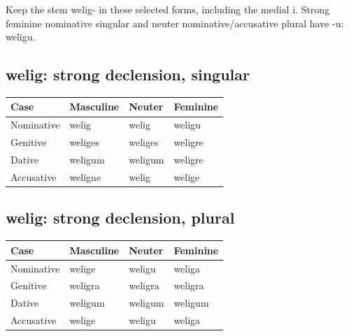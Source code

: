 Keep the stem welig- in these selected forms, including the medial i. Strong feminine nominative singular and neuter nominative/\allowbreak{}accusative plural have -u: weligu.

\subsection*{welig: strong declension, singular}

\par\begingroup
\fontsize{10.5}{13.2}\selectfont
\setlength{\LTleft}{0pt}\setlength{\LTright}{\fill}
\noindent
\begin{tabular}{@{}>{\raggedright\arraybackslash}p{28.89mm}>{\raggedright\arraybackslash}p{28.89mm}>{\raggedright\arraybackslash}p{28.89mm}>{\raggedright\arraybackslash}p{28.89mm}@{}}
\toprule
\textbf{Case} & \textbf{Masculine} & \textbf{Neuter} & \textbf{Feminine} \\
\midrule
Nominative & welig & welig & weligu \\
Genitive & weliges & weliges & weligre \\
Dative & weligum & weligum & weligre \\
Accusative & weligne & welig & welige \\
\bottomrule
\end{tabular}
\par\endgroup

\subsection*{welig: strong declension, plural}

\par\begingroup
\fontsize{10.5}{13.2}\selectfont
\setlength{\LTleft}{0pt}\setlength{\LTright}{\fill}
\noindent
\begin{tabular}{@{}>{\raggedright\arraybackslash}p{28.89mm}>{\raggedright\arraybackslash}p{28.89mm}>{\raggedright\arraybackslash}p{28.89mm}>{\raggedright\arraybackslash}p{28.89mm}@{}}
\toprule
\textbf{Case} & \textbf{Masculine} & \textbf{Neuter} & \textbf{Feminine} \\
\midrule
Nominative & welige & weligu & weliga \\
Genitive & weligra & weligra & weligra \\
Dative & weligum & weligum & weligum \\
Accusative & welige & weligu & weliga \\
\bottomrule
\end{tabular}
\par\endgroup

